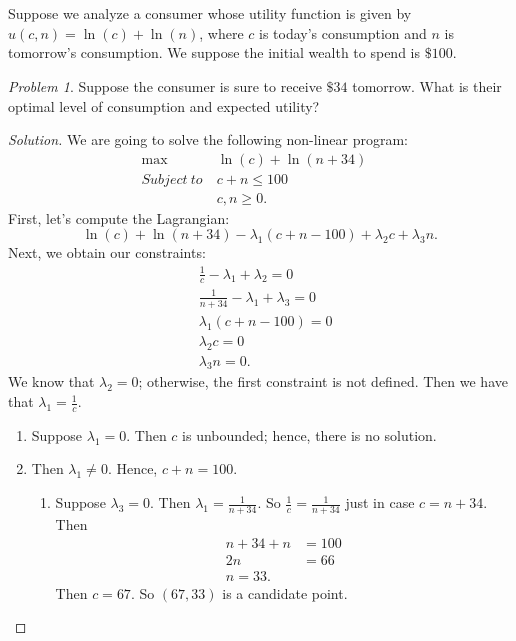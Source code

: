 \documentclass[12pt]{article}
\theoremstyle{definition}
\theoremstyle{remark}
\newtheorem{prob}{Problem}[section]
\begin{document}
\section{}
Suppose we analyze a consumer whose utility function is given by $u(c,n) = \ln(c) + \ln(n)$, where $c$ is today's consumption and $n$ is tomorrow's consumption. We suppose the initial wealth to spend is $\$ 100$.
\begin{prob}
  Suppose the consumer is sure to receive $\$ 34$ tomorrow. What is their optimal level of consumption and expected utility?
\end{prob}
\begin{proof}[Solution]
  We are going to solve the following non-linear program:
  \begin{align*}
    \max &\ln(c) + \ln(n + 34) &\\
    Subject \ to \ &c + n \leq 100 & \\
    & c, n \geq 0. &
  \end{align*}
  First, let's compute the Lagrangian:
  $$\ln(c) + \ln(n + 34) - \lambda_1(c + n - 100) + \lambda_2c + \lambda_3n.$$
  Next, we obtain our constraints:
  \begin{align*}
    &\frac{1}{c} - \lambda_1 + \lambda_2 = 0\\
    &\frac{1}{n + 34} - \lambda_1 + \lambda_3 = 0 \\
    &\lambda_1(c + n - 100) = 0 \\
    &\lambda_2c = 0 \\
    &\lambda_3n = 0.
  \end{align*}
  We know that $\lambda_2 = 0$; otherwise, the first constraint is not defined. Then we have that $\lambda_1 = \frac{1}{c}$.
  \begin{enumerate}
    \item Suppose $\lambda_1 = 0$. Then $c$ is unbounded; hence, there is no solution.
    \item Then $\lambda_1 \neq 0$. Hence, $c + n = 100$.
    \begin{enumerate}
      \item Suppose $\lambda_3 = 0$. Then $\lambda_1 = \frac{1}{n + 34}$. So $\frac{1}{c} = \frac{1}{n + 34}$ just in case $c = n + 34$. Then
      \begin{align*}
        n + 34 + n &= 100 \\
        2n &= 66 \\
        n = 33.
      \end{align*}
      Then $c = 67$. So $(67, 33)$ is a candidate point.

\end{enumerate}
\end{enumerate}
\end{proof}
\end{document}
